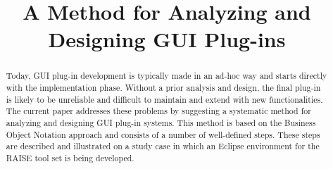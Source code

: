 \documentclass[conference]{IEEEtran}
\begin{document}
%
\title{A Method for Analyzing and Designing GUI Plug-ins}


\author{
\and

\and

}





\maketitle


\begin{abstract}
Today, GUI plug-in development is typically made in an ad-hoc way and starts directly with the implementation phase.
Without a prior analysis and design, the final plug-in is likely to be unreliable and difficult to maintain and extend with new functionalities. 
The current paper addresses these problems by suggesting a systematic method for analyzing and designing GUI plug-in systems. 
This method is based on the Business Object Notation approach and consists of a number of well-defined steps. 
These steps are described and illustrated on a study case in which an Eclipse environment for the RAISE tool set is being developed.
\end{abstract}

\end{document}
